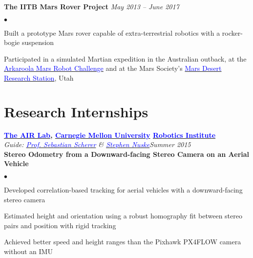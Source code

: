 \documentclass[margin,line]{res}
\newenvironment{list2}{
  \begin{list}{$\bullet$}{%
      \setlength{\itemsep}{0in}
      \setlength{\parsep}{0in} \setlength{\parskip}{0in}
      \setlength{\topsep}{0in} \setlength{\partopsep}{0in} 
      \setlength{\leftmargin}{0.18in}}}{\end{list}}
\begin{document}
\begin{resume}
\vspace*{-0.13in}

{\bf The IITB Mars Rover Project}
\hfill {\it May 2013 -- June 2017} \\
\vspace*{-.13in}
\begin{list2}
\item Built a prototype Mars rover capable of extra-terrestrial robotics with a rocker-bogie suspension
\item Participated in a simulated Martian expedition in the Australian outback, at the \href{http://marssociety.org.au/article/arkaroola-mars-robot-challenge-spaceward-bound-expedition}{\textcolor{blue} {Arkaroola Mars Robot Challenge}} and at the Mars Society's \href{http://mdrs.marssociety.org/}{\textcolor{blue} {Mars Desert Research Station}}, Utah
\end{list2}


\section{\sc Research Internships} 

{\bf  \href{http://theairlab.org/}{\textcolor{blue}{The AIR Lab}}, \href{http://www.cmu.edu/}{\textcolor{blue}{Carnegie Mellon University}} \href{http://ri.cmu.edu/}{\textcolor{blue}{Robotics Institute}}} \\
{\em Guide: \href{http://www.ri.cmu.edu/person.html?person_id=1397}{\textcolor{blue}{Prof. Sebastian Scherer}} \& \href{http://www.ri.cmu.edu/person.html?person_id=2128}{\textcolor{blue} {Stephen Nuske}}}\hfill\textit{Summer 2015} \\
\vspace*{-.13in}
\textbf{Stereo Odometry from a Downward-facing Stereo Camera on an Aerial Vehicle} \\
\vspace*{-.01in}
\begin{list2}
\item Developed correlation-based tracking for aerial vehicles with a downward-facing stereo camera
\item Estimated height and orientation using a robust homography fit between stereo pairs and position with rigid tracking
\item Achieved better speed and height ranges than the Pixhawk PX4FLOW camera without an IMU
\end{list2}


\end{resume}
\end{document}
